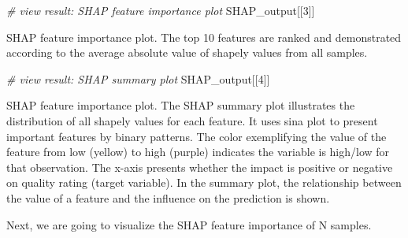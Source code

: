 \documentclass[]{article}
\newcommand{\hlnum}[1]{\textcolor[rgb]{0.816,0.125,0.439}{#1}}%
\newcommand{\hlcom}[1]{\textcolor[rgb]{0.502,0.502,0.502}{\textit{#1}}}%
\newcommand{\hlstd}[1]{\textcolor[rgb]{0.251,0.251,0.251}{#1}}%
\newenvironment{Shaded}{\begin{myshaded}}{\end{myshaded}}
\newcommand{\DecValTok}[1]{\hlnum{#1}}
\newcommand{\CommentTok}[1]{\hlcom{#1}}
\newcommand{\NormalTok}[1]{\hlstd{#1}}
\begin{document}
\begin{Shaded}
\begin{Highlighting}[]
\CommentTok{# view result: SHAP feature importance plot}
\NormalTok{SHAP_output[[}\DecValTok{3}\NormalTok{]]}
\end{Highlighting}
\end{Shaded}

\label{fig:unnamed-chunk-64}SHAP feature importance plot. The top 10 features are ranked and demonstrated according to the average absolute value of shapely values from all samples.

\begin{Shaded}
\begin{Highlighting}[]
\CommentTok{# view result: SHAP summary plot}
\NormalTok{SHAP_output[[}\DecValTok{4}\NormalTok{]] }
\end{Highlighting}
\end{Shaded}

\label{fig:unnamed-chunk-65}SHAP feature importance plot. The SHAP summary plot illustrates the distribution of all shapely values for each feature. It uses sina plot to present important features by binary patterns. The color exemplifying the value of the feature from low (yellow) to high (purple) indicates the variable is high/low for that observation. The x-axis presents whether the impact is positive or negative on quality rating (target variable). In the summary plot, the relationship between the value of a feature and the influence on the prediction is shown.

Next, we are going to visualize the SHAP feature importance of N samples.
\end{document}
